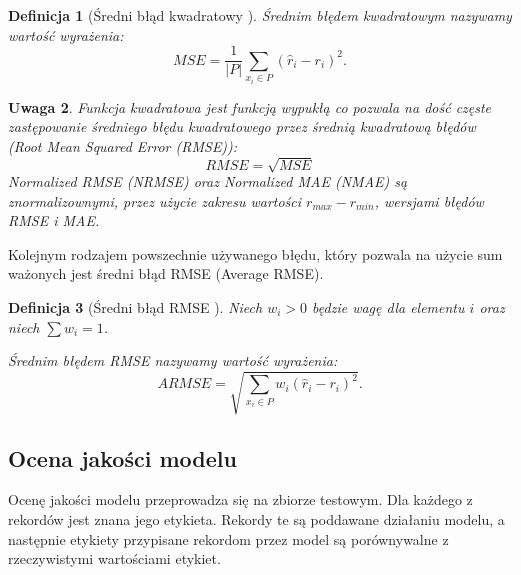 \documentclass[12pt,a4paper]{report}
\newtheorem{df}{Definicja}[chapter]
\newtheorem{uwaga}[df]{Uwaga}
\begin{document}
\begin{df}[Średni błąd kwadratowy  {\citep[Sec 4.1.1]{rsh}}]
Średnim błędem kwadratowym nazywamy wartość wyrażenia:
$$
MSE = \frac{1}{|\mathit{P}|}\sum_{x_i \in \mathit{P}}(\widehat{r}_i-r_i)^2.
$$
\end{df}
\begin{uwaga}{\citep[Sec 4.1.1]{rsh}}
Funkcja kwadratowa jest funkcją wypukłą co pozwala na dość częste zastępowanie średniego błędu kwadratowego przez średnią kwadratową błędów (Root Mean Squared Error (RMSE)):
$$
RMSE = \sqrt{MSE}
$$
Normalized RMSE (NRMSE) oraz Normalized MAE (NMAE) są znormalizownymi, przez użycie zakresu wartości $r_{max} - r_{min}$, wersjami błędów RMSE i MAE.
\end{uwaga}
Kolejnym rodzajem powszechnie używanego błędu, który pozwala na użycie sum ważonych jest średni błąd RMSE (Average RMSE).

\begin{df}[Średni błąd RMSE {\citep[Sec 4.1.1]{rsh}}]
Niech $w_i>0$ będzie wagę dla elementu $i$ oraz niech $\sum w_i = 1$.

Średnim błędem RMSE nazywamy wartość wyrażenia:
$$
ARMSE = \sqrt{\sum_{x_i\in \mathit{P}}w_{i}(\widehat{r}_i-r_i)^2}.
$$
\end{df}
\subsection{Ocena jakości modelu}
Ocenę jakości modelu przeprowadza się na zbiorze testowym. Dla każdego z rekordów jest znana jego etykieta. Rekordy te są poddawane działaniu modelu, a następnie etykiety przypisane rekordom przez model są porównywalne z rzeczywistymi wartościami etykiet.
\end{document}
